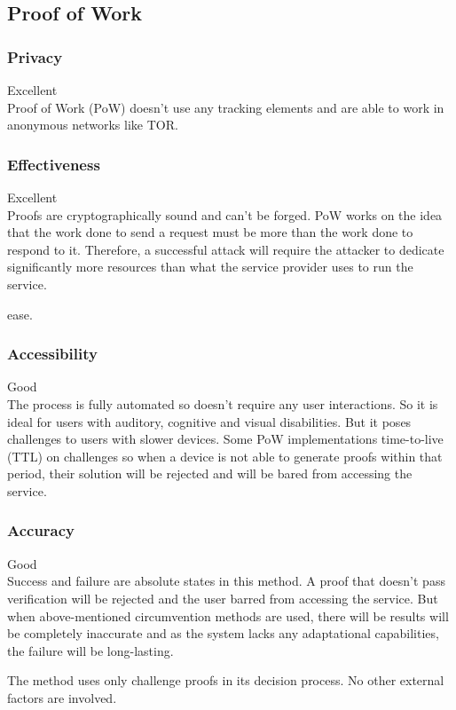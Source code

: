 \subsection{Proof of Work}

\subsubsection{Privacy}
Excellent\\
Proof of Work (PoW) doesn't use any tracking elements and are able to work
in anonymous networks like TOR\@.

\subsubsection{Effectiveness}
Excellent\\

Proofs are cryptographically sound and can't be forged. PoW works on the idea
that the work done to send a request must be more than the work done to respond
to it. Therefore, a successful attack will require the attacker to dedicate
significantly more resources than what the service provider uses to run the
service.

ease.
\subsubsection{Accessibility}
Good\\

The process is fully automated so doesn't require any user interactions. So it
is ideal for users with auditory, cognitive and visual disabilities. But it
poses challenges to users with slower devices. Some PoW implementations
time-to-live (TTL) on challenges so when a device is not able to generate proofs
within that period, their solution will be rejected and will be bared from
accessing the service.

\subsubsection{Accuracy}
Good\\

Success and failure are absolute states in this method. A proof that doesn't
pass verification will be rejected and the user barred from accessing the
service. But when above-mentioned circumvention methods are used, there will be
results will be completely inaccurate and as the system lacks any adaptational
capabilities, the failure will be long-lasting.  

The method uses only challenge proofs in its decision process. No other
external factors are involved.
